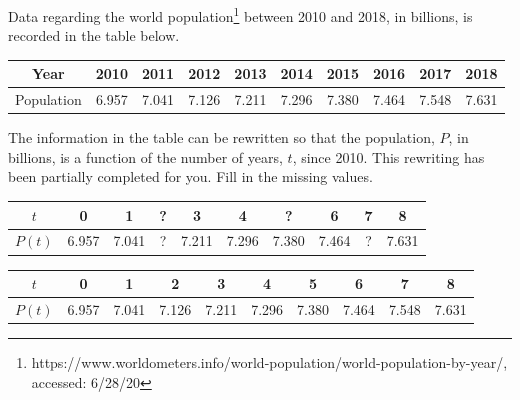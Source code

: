 \begin{exercise}\label{exercise-1_3-population}
Data regarding the world population\footnote{https://www.worldometers.info/world-population/world-population-by-year/, accessed: 6/28/20} between 2010 and 2018, in billions, is recorded in the table below.

\begin{center}\footnotesize
\begin{tabular}{|c|c|c|c|c|c|c|c|c|c|}
\hline Year &2010 & 2011 & 2012 & 2013 & 2014 & 2015 & 2016 & 2017 & 2018
\\\hline Population & 6.957 & 7.041  & 7.126& 7.211  & 7.296 & 7.380 &7.464  & 7.548 & 7.631
\\\hline
\end{tabular}
\end{center}

The information in the table can be rewritten so that the population, $P$, in billions, is a function of the number of years, $t$, since 2010. This rewriting has been partially completed for you. Fill in the missing values.



\begin{center}\small
\begin{tabular}{|c|c|c|c|c|c|c|c|c|c|}
\hline $t$ &0 & 1 & ? & 3 & 4 & ? & 6 & 7 & 8
\\\hline $P(t)$ & 6.957 & 7.041  & ? & 7.211  & 7.296 & 7.380 &7.464  & ? & 7.631
\\\hline
\end{tabular}
\end{center}

 \end{exercise}



\begin{solution}
    \begin{center}\footnotesize
\begin{tabular}{|c|c|c|c|c|c|c|c|c|c|}
\hline $t$ &0 & 1 & \color{red}2 & 3 & 4 & \color{red}5 & 6 & 7 & 8
\\\hline $P(t)$ & 6.957 & 7.041  & \color{red}7.126& 7.211  & 7.296 & 7.380 &7.464  & \color{red}7.548 & 7.631
\\\hline
\end{tabular}
\end{center}
\end{solution}






